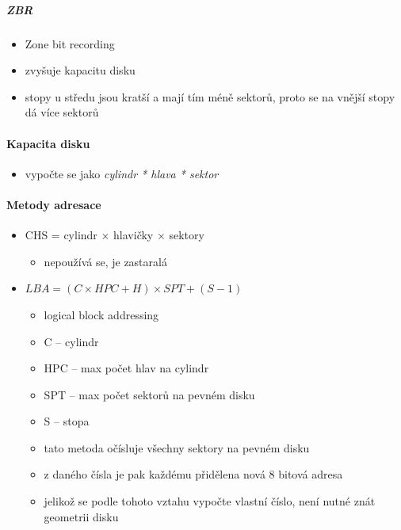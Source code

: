 \documentclass[a4paper,12pt]{article}
\providecommand{\tightlist}{%
\setlength{\itemsep}{0pt}\setlength{\parskip}{0pt}}
\begin{document}
\subparagraph{ZBR}

\begin{itemize}
\tightlist
\item Zone bit recording
\item zvyšuje kapacitu disku
\item stopy u středu jsou kratší a mají tím méně sektorů, proto se na vnější
  stopy dá více sektorů
\end{itemize}

\paragraph{Kapacita disku}

\begin{itemize}
\tightlist
\item vypočte se jako \emph{cylindr * hlava * sektor}
\end{itemize}

\paragraph{Metody adresace}

\begin{itemize}
\tightlist
\item CHS = cylindr × hlavičky × sektory

  \begin{itemize}
  \tightlist
  \item nepoužívá se, je zastaralá
  \end{itemize}
\item $LBA = (C \times HPC + H) \times SPT + (S - 1)$

  \begin{itemize}
  \tightlist
  \item logical block addressing
  \item C -- cylindr
  \item HPC -- max počet hlav na cylindr
  \item SPT -- max počet sektorů na pevném disku
  \item S -- stopa
  \item tato metoda očísluje všechny sektory na pevném disku
  \item z daného čísla je pak každému přidělena nová 8 bitová adresa
  \item jelikož se podle tohoto vztahu vypočte vlastní číslo, není nutné
    znát geometrii disku
  \end{itemize}
\end{itemize}
\end{document}
